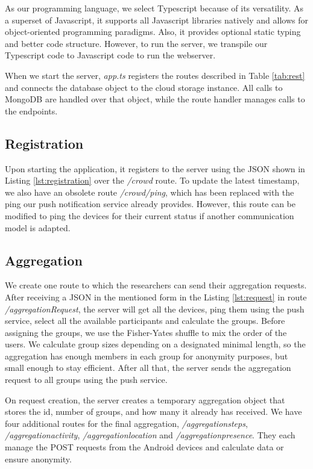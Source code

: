 As our programming language, we select Typescript because of its versatility. As a superset of Javascript, it supports all Javascript libraries natively and allows for object-oriented programming paradigms. Also, it provides optional static typing and better code structure. However, to run the server, we transpile our Typescript code to Javascript code to run the webserver.

When we start the server, \textit{app.ts} registers the routes described in Table \ref{tab:rest} and connects the database object to the cloud storage instance. All calls to MongoDB are handled over that object, while the route handler manages calls to the endpoints.

\subsection{Registration}
Upon starting the application, it registers to the server using the JSON shown in Listing \ref{lst:registration} over the \textit{/crowd} route. To update the latest timestamp, we also have an obsolete route \textit{/crowd/ping}, which has been replaced with the ping our push notification service already provides. However, this route can be modified to ping the devices for their current status if another communication model is adapted.

\subsection{Aggregation}
We create one route to which the researchers can send their aggregation requests. After receiving a JSON in the mentioned form in the Listing \ref{lst:request} in route \textit{/aggregationRequest}, the server will get all the devices, ping them using the push service, select all the available participants and calculate the groups. Before assigning the groups, we use the Fisher-Yates shuffle to mix the order of the users. We calculate group sizes depending on a designated minimal length, so the aggregation has enough members in each group for anonymity purposes, but small enough to stay efficient. After all that, the server sends the aggregation request to all groups using the push service.

On request creation, the server creates a temporary aggregation object that stores the id, number of groups, and how many it already has received. We have four additional routes for the final aggregation, \textit{/aggregationsteps}, \textit{/aggregationactivity}, \textit{/aggregationlocation} and \textit{/aggregationpresence}. They each manage the POST requests from the Android devices and calculate data or ensure anonymity.

